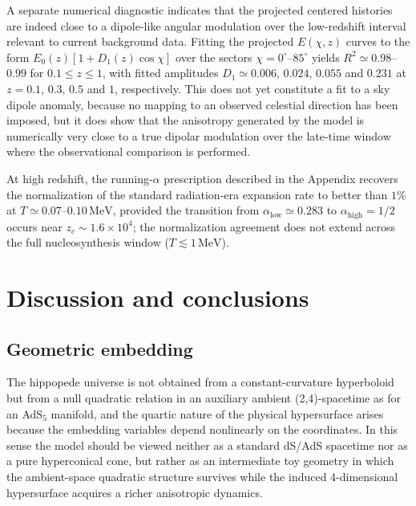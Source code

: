 \documentclass[preprint,12pt]{elsarticle}
\begin{document}
A separate numerical diagnostic indicates that the projected centered histories are indeed close to a dipole-like angular modulation over the low-redshift interval relevant to current background data. Fitting the projected $E(\chi,z)$ curves to the form $E_0(z)[1+D_1(z)\cos\chi]$ over the sectors $\chi=0^\circ$--$85^\circ$ yields $R^2\simeq0.98$--$0.99$ for $0.1\le z\le1$, with fitted amplitudes $D_1\simeq0.006$, $0.024$, $0.055$ and $0.231$ at $z=0.1$, $0.3$, $0.5$ and $1$, respectively. This does not yet constitute a fit to a sky dipole anomaly, because no mapping to an observed celestial direction has been imposed, but it does show that the anisotropy generated by the model is numerically very close to a true dipolar modulation over the late-time window where the observational comparison is performed.

At high redshift, the running-$\alpha$ prescription described in the Appendix recovers the normalization of the standard radiation-era expansion rate to better than $1\%$ at $T\simeq0.07$--$0.10\,\mathrm{MeV}$, provided the transition from $\alpha_{\mathrm{low}}\simeq0.283$ to $\alpha_{\mathrm{high}}=1/2$ occurs near $z_c\sim1.6\times10^4$; the normalization agreement does not extend across the full nucleosynthesis window ($T\lesssim1\,\mathrm{MeV}$).

\section{Discussion and conclusions}\label{sec:discussion}

\subsection{Geometric embedding}

The hippopede universe is not obtained from a constant-curvature hyperboloid but from a null quadratic relation in an auxiliary ambient (2,4)-spacetime as for an AdS${}_5$ manifold, and the quartic nature of the physical hypersurface arises because the embedding variables depend nonlinearly on the coordinates. In this sense the model should be viewed neither as a standard dS/AdS spacetime nor as a pure hyperconical cone, but rather as an intermediate toy geometry in which the ambient-space quadratic structure survives while the induced 4-dimensional hypersurface acquires a richer anisotropic dynamics.
\end{document}
